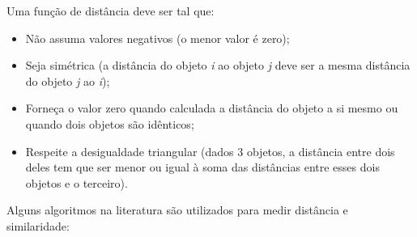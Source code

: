 Uma função de distância deve ser tal que:
\begin{itemize}
    \item Não assuma valores negativos (o menor valor é zero);
    \item Seja simétrica (a distância do objeto \textit{i} ao objeto \textit{j} deve ser a mesma distância do objeto \textit{j} ao \textit{i});
    \item Forneça o valor zero quando calculada a distância do objeto a si mesmo ou quando dois objetos são idênticos;
    \item Respeite a desigualdade triangular (dados 3 objetos, a distância entre dois deles tem que ser menor ou igual à soma das distâncias entre esses dois objetos e o terceiro).
\end{itemize}

Alguns algoritmos na literatura são utilizados para medir distância e similaridade:

